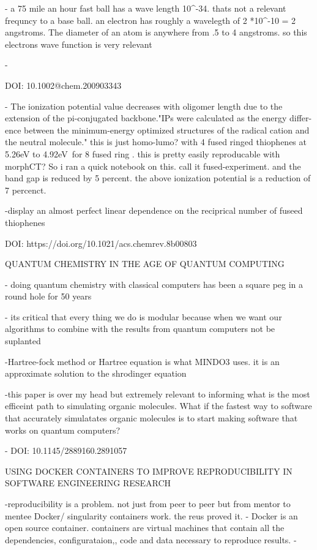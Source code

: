     - a 75 mile an hour fast ball has  a wave length 10^-34. thats not a relevant frequncy
    to a base ball. an electron has roughly a wavelegth of 2 *10^{-10} = 2 angstroms. The diameter of
    an atom is anywhere from .5 to 4 angstroms. so this electrons wave function is very relevant

    -

DOI: 10.1002@chem.200903343

    - The ionization potential value decreases with oligomer length due to the extension of
    the pi-conjugated backbone."IPs were calculated as the energy differ- ence between 
    the minimum-energy optimized structures of the radical cation and the neutral molecule." 
    this is just homo-lumo?  with 4 fused ringed thiophenes at 5.26eV to 4.92eV for 8 fused
    ring . this is pretty easily reproducable with morphCT? So i ran a quick notebook on this.
    call it fused-experiment. and the band gap is reduced by 5 percent. the above ionization potential
    is a reduction of 7 percenct. 

    -display an almost perfect linear dependence on the reciprical number of fuseed thiophenes

DOI: https://doi.org/10.1021/acs.chemrev.8b00803
    
    QUANTUM CHEMISTRY IN THE AGE OF QUANTUM COMPUTING

    - doing quantum chemistry with classical computers has been a square peg in a round hole for
    50 years

    - its critical that every thing we do is modular because when we want our algorithms to 
    combine with the results from quantum computers not be suplanted

    -Hartree-fock method or Hartree equation is what MINDO3 uses. it is an approximate solution
    to the shrodinger equation 

    -this paper is over my head but extremely relevant to informing what is the most efficeint
    path to simulating organic molecules. What if the fastest way to software that accurately 
    simulatates organic molecules is to start making software that works on quantum computers?

    -
DOI: 10.1145/2889160.2891057

    USING DOCKER CONTAINERS TO IMPROVE REPRODUCIBILITY IN SOFTWARE ENGINEERING RESEARCH

    -reproducibility is a problem. not just from peer to peer but from mentor to mentee
    Docker/ singularity containers work. the reus proved it. 
    - Docker is an open source container. containers are virtual machines that contain all the
    dependencies, configurataion,, code and data necessary to reproduce results. 
    -
    
